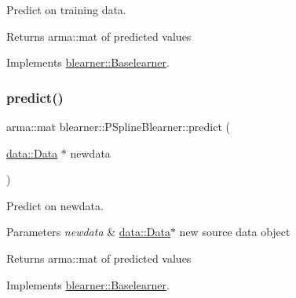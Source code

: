 Predict on training data. 

\begin{DoxyReturn}{Returns}
{\ttfamily arma\+::mat} of predicted values 
\end{DoxyReturn}


Implements \mbox{\hyperlink{classblearner_1_1_baselearner_ab37986047db43c84420fef2cef7fc20d}{blearner\+::\+Baselearner}}.

\mbox{\label{classblearner_1_1_p_spline_blearner_a9d35aeb36c403c167fb7519379825873}} 
\subsubsection{\texorpdfstring{predict()}{predict()}\hspace{0.1cm}{\footnotesize\ttfamily [2/2]}}
{\footnotesize\ttfamily arma\+::mat blearner\+::\+P\+Spline\+Blearner\+::predict (\begin{DoxyParamCaption}\item[{\mbox{\hyperlink{classdata_1_1_data}{data\+::\+Data}} $\ast$}]{newdata }\end{DoxyParamCaption})\hspace{0.3cm}{\ttfamily [virtual]}}



Predict on newdata. 


\begin{DoxyParams}{Parameters}
{\em newdata} & {\ttfamily \mbox{\hyperlink{classdata_1_1_data}{data\+::\+Data}}$\ast$} new source data object\\
\hline
\end{DoxyParams}
\begin{DoxyReturn}{Returns}
{\ttfamily arma\+::mat} of predicted values 
\end{DoxyReturn}


Implements \mbox{\hyperlink{classblearner_1_1_baselearner_ae2ef5e018783578e02b3b5a33fa94eae}{blearner\+::\+Baselearner}}.

